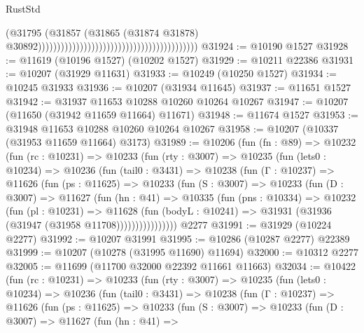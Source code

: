 \begin{lexlean}{RustStd}
\begin{coremodule}
                                                                                  (@31795
                                                                                    (@31857
                                                                                      (@31865
                                                                                        (@31874
                                                                                          @31878)
                                                                                        @30892))))))))))))))))))))))))))))))))))))))))))
@31924 := @10190 @1527
@31928 := @11619 (@10196 @1527) (@10202 @1527)
@31929 := @10211 @22386
@31931 := @10207 (@31929 @11631)
@31933 := @10249 (@10250 @1527)
@31934 := @10245 @31933
@31936 := @10207 (@31934 @11645)
@31937 := @11651 @1527
@31942 := @31937 @11653 @10288 @10260 @10264 @10267
@31947 := @10207 (@11650 (@31942 @11659 @11664) @11671)
@31948 := @11674 @1527
@31953 := @31948 @11653 @10288 @10260 @10264 @10267
@31958 := @10207 (@10337 (@31953 @11659 @11664) @3173)
@31989 := @10206
    (fun (fn : @89) =>
    @10232
      (fun (rc : @10231) =>
      @10233
        (fun (rty : @3007) =>
        @10235
          (fun (lets0 : @10234) =>
          @10236
            (fun (tail0 : @3431) =>
            @10238
              (fun (Γ : @10237) =>
              @11626
                (fun (ps : @11625) =>
                @10233
                  (fun (S : @3007) =>
                  @10233
                    (fun (D : @3007) =>
                    @11627
                      (fun (hn : @41) =>
                      @10335
                        (fun (pns : @10334) =>
                        @10232
                          (fun (pl : @10231) =>
                          @11628
                            (fun (bodyL : @10241) =>
                            @31931 (@31936 (@31947 (@31958 @11708))))))))))))))))
    @2277
@31991 := @31929 (@10224 @2277)
@31992 := @10207 @31991
@31995 := @10286 (@10287 @2277) @22389
@31999 := @10207 (@10278 (@31995 @11690) @11694)
@32000 := @10312 @2277
@32005 := @11699 (@11700 @32000 @22392 @11661 @11663)
@32034 := @10422
    (fun (rc : @10231) =>
    @10233
      (fun (rty : @3007) =>
      @10235
        (fun (lets0 : @10234) =>
        @10236
          (fun (tail0 : @3431) =>
          @10238
            (fun (Γ : @10237) =>
            @11626
              (fun (ps : @11625) =>
              @10233
                (fun (S : @3007) =>
                @10233
                  (fun (D : @3007) =>
                  @11627
                    (fun (hn : @41) =>

\end{coremodule}
\end{lexlean}

